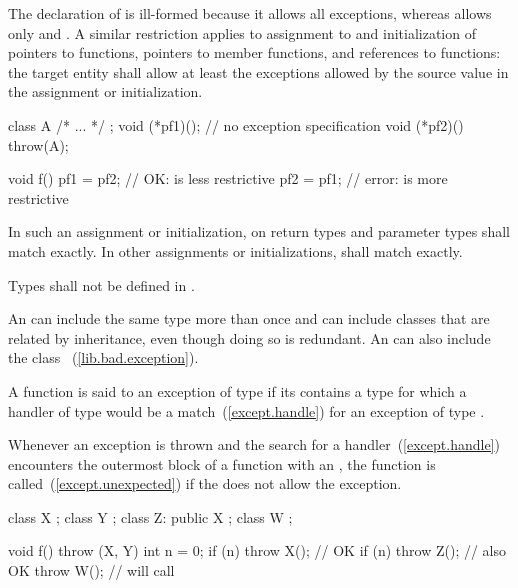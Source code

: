 The declaration of
is ill-formed because it allows all exceptions, whereas
allows only
and
.
\exitexample
A similar restriction applies to assignment to and
initialization of pointers to functions, pointers
to member functions, and references to functions:
the target entity shall allow at least the exceptions
allowed by the source value in the assignment or
initialization.
\enterexample
\begin{codeblock}
class A { /* ... */ };
void (*pf1)();			// no exception specification
void (*pf2)() throw(A);

void f()
{
	pf1 = pf2;		// OK:  is less restrictive
	pf2 = pf1;		// error:  is more restrictive
}
\end{codeblock}
\exitexampleb

\pnum
In such an assignment or initialization,
on return types and parameter types shall match exactly.
In other assignments or initializations,
shall match exactly.

\pnum
Types shall not be defined in .

\pnum
An
can include the same type more than once
and can include classes that are related by inheritance,
even though doing so is redundant.
An
can also include the class
~(\ref{lib.bad.exception}).

\pnum
{}%
%
A function is said to
an exception of type
if its
contains a type
for which a handler of type
would be a match~(\ref{except.handle}) for an exception of type
.

\pnum
{}%
%
Whenever an exception is thrown and the search for a handler~(\ref{except.handle})
encounters the outermost block of a function with an
, the function
 is called~(\ref{except.unexpected}) if the
 does not allow the exception.
\enterexample
\begin{codeblock}
class X { };
class Y { };
class Z: public X { };
class W { };

void f() throw (X, Y)
{
    int n = 0;
    if (n) throw X();		// OK
    if (n) throw Z();		// also OK
    throw W();			// will call 
}
\end{codeblock}
\exitexampleb


